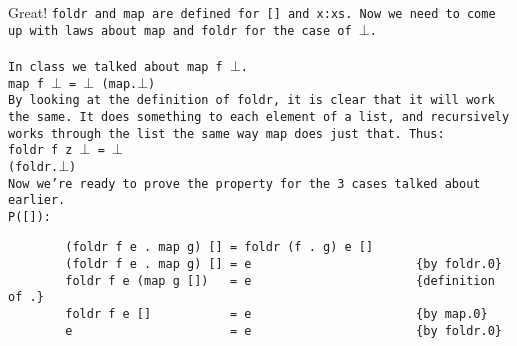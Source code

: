 \documentclass{article}
\begin{document}
\noindent Great! \tt foldr \rm and \tt map \rm are defined for \tt [] and \tt x:xs\rm.
Now we need to come up with laws about \tt map \rm and \tt foldr
\rm for the case of $\bot$.\\
\\
In class we talked about \tt map f $\bot$\rm .\\
\indent\indent\indent \tt    map f $\bot$       = $\bot$ (map.$\bot$)
\\
\rm By looking at the definition of \tt foldr\rm, it is clear that it will work the same.
It does something to each element of a list, and recursively works through the list
the same way map does just that.
Thus:\\
\indent\indent\indent\tt     foldr f z $\bot$   = $\bot$\\ (foldr.$\bot$)
\\
\rm Now we're ready to prove the property for the 3 cases talked about earlier.\\
\indent P(\tt[]\rm):
\begin{verbatim}
        (foldr f e . map g) [] = foldr (f . g) e []
        (foldr f e . map g) [] = e                       {by foldr.0}
        foldr f e (map g [])   = e                       {definition of .}
        foldr f e []           = e                       {by map.0}
        e                      = e                       {by foldr.0}
\end{verbatim}

\pagebreak

\end{document}
